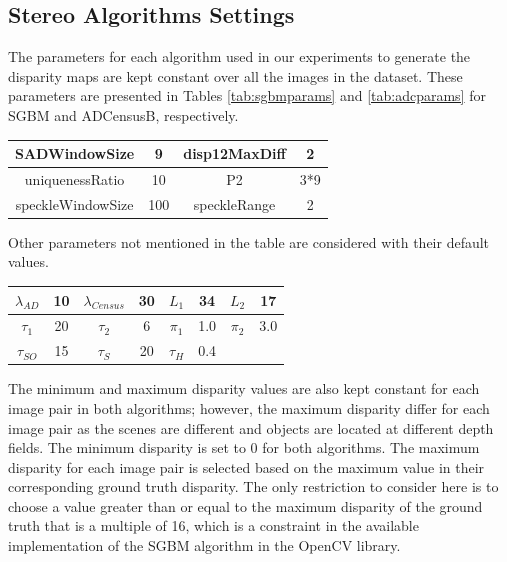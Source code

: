 \subsection{Stereo Algorithms Settings}
The parameters for each algorithm used in our experiments to generate the disparity
maps are kept constant over all the images in the dataset. These parameters are presented in Tables \ref{tab:sgbmparams} and \ref{tab:adcparams} 
for SGBM and ADCensusB, respectively. \newline

\begin{minipage}{\linewidth}
\begin{center}
\label{tab:sgbmparams}
\begin{tabular}{ |c|c|c|c|}
\hline
SADWindowSize & 9 & disp12MaxDiff & 2 \\ \hline
uniquenessRatio & 10 & P2 & 3*9 \\ \hline
speckleWindowSize & 100 & speckleRange & 2 \\ \hline
\end{tabular}
\end{center}
\end{minipage} \newline \newline

\noindent
Other parameters not mentioned in the table are considered with their default values. \newline

\begin{minipage}{\linewidth}
\begin{center}
\label{tab:adcparams}
\begin{tabular}{|c|c|c|c|c|c|c|c|}
\hline
$\lambda_{AD}$ & 10 & $\lambda_{Census}$ & 30 & $L_{1}$ & 34 & $L_{2}$ & 17 \\ \hline
$\tau_{1}$ & 20 & $\tau_{2}$ & 6 & $\pi_{1}$ & 1.0 & $\pi_{2}$ & 3.0 \\ \hline 
$\tau_{SO}$ & 15 & $\tau_{S}$ & 20 & $\tau_{H}$ & 0.4 & & \\  \hline
\end{tabular}
\end{center}
\end{minipage} \newline \newline

The minimum and maximum disparity values are also kept constant for each image pair in both algorithms; however, the maximum 
disparity differ for each image pair as the scenes are different
and objects are located at different depth fields.
The minimum disparity is set to $0$ for both algorithms. The maximum disparity for each image pair is selected based on the maximum value in their
corresponding ground truth disparity. The only restriction to consider here is to choose a value greater than or equal to 
the maximum disparity of the ground truth that is a multiple of 16, which is a constraint
in the available implementation of the SGBM algorithm in the OpenCV library.

